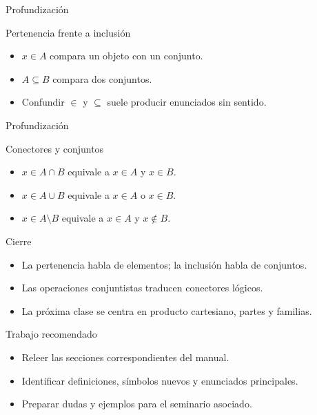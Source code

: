 \documentclass[aspectratio=169,11pt]{beamer}
\begin{document}
\begin{frame}{Profundización}
\begin{block}{Pertenencia frente a inclusión}
\begin{itemize}
  \item \(x\in A\) compara un objeto con un conjunto.
  \item \(A\subseteq B\) compara dos conjuntos.
  \item Confundir \(\in\) y \(\subseteq\) suele producir enunciados sin sentido.
\end{itemize}
\end{block}
\end{frame}

\begin{frame}{Profundización}
\begin{block}{Conectores y conjuntos}
\begin{itemize}
  \item \(x\in A\cap B\) equivale a \(x\in A\) y \(x\in B\).
  \item \(x\in A\cup B\) equivale a \(x\in A\) o \(x\in B\).
  \item \(x\in A\setminus B\) equivale a \(x\in A\) y \(x\notin B\).
\end{itemize}
\end{block}
\end{frame}

\begin{frame}{Cierre}
\begin{itemize}
  \item La pertenencia habla de elementos; la inclusión habla de conjuntos.
  \item Las operaciones conjuntistas traducen conectores lógicos.
  \item La próxima clase se centra en producto cartesiano, partes y familias.
\end{itemize}
\end{frame}

\begin{frame}{Trabajo recomendado}
\begin{itemize}
  \item Releer las secciones correspondientes del manual.
  \item Identificar definiciones, símbolos nuevos y enunciados principales.
  \item Preparar dudas y ejemplos para el seminario asociado.
\end{itemize}
\end{frame}
\end{document}
